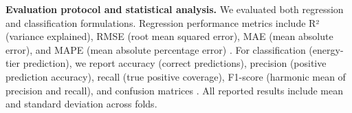 


\textbf{Evaluation protocol and statistical analysis.}
We evaluated both regression and classification formulations. Regression performance metrics include R² (variance explained), RMSE (root mean squared error), MAE (mean absolute error), and MAPE (mean absolute percentage error) \cite{Botchkarev2018PerformanceM}\cite{Chicco2021TheCO}. For classification (energy-tier prediction), we report accuracy (correct predictions), precision (positive prediction accuracy), recall (true positive coverage), F1-score (harmonic mean of precision and recall), and confusion matrices \cite{SOKOLOVA2009427}. All reported results include mean and standard deviation across folds.


